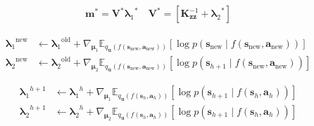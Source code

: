 \documentclass{article}
\newcommand{\state}{\ensuremath{\mathbf{s}}}
\newcommand{\action}{\ensuremath{\mathbf{a}}}
\newcommand{\inducingVariable}{\ensuremath{\mathbf{u}}}
\newcommand{\dualParam}[1]{\ensuremath{\bm{\lambda}_{#1}}}
\newcommand{\meanParam}[1]{\ensuremath{\bm{\mu}_{#1}}}
\newcommand{\horizon}{\ensuremath{h}}
\newcommand{\latentFn}{\ensuremath{f}}
\begin{document}
\begin{align} \label{eq-dual-params}
  \mathbf{m}^{*} = \mathbf{V}^{*}\dualParam{1}^{*} \quad \mathbf{V}^{*} = [\mathbf{K}_{\mathbf{z}\mathbf{z}}^{-1} + \dualParam{2}^{*}]
\end{align}

\begin{align} \label{eq-dual-update-svgp-old-new}
 \dualParam{1}^{\text{new}} &\leftarrow \dualParam{1}^{\text{old}} +
  \nabla_{\meanParam{1}} \mathbb{E}_{q_{\inducingVariable}(\latentFn(\state_{\text{new}}, \action_{\text{new}}))}
 \left[ \log p(\state_{\text{new}} \mid \latentFn(\state_{\text{new}}, \action_{\text{new}}) ) \right] \\
 \dualParam{2}^{\text{new}} &\leftarrow \dualParam{2}^{\text{old}} +
  \nabla_{\meanParam{2}} \mathbb{E}_{q_{\inducingVariable}(\latentFn(\state_{\text{new}}, \action_{\text{new}}))}
 \left[ \log p(\state_{\horizon+1} \mid \latentFn(\state_{\text{new}}, \action_{\text{new}}) ) \right]
\end{align}

\begin{align} \label{eq-dual-update-svgp}
 \dualParam{1}^{\horizon+1} &\leftarrow \dualParam{1}^{\horizon} +
  \nabla_{\meanParam{1}} \mathbb{E}_{q_{\inducingVariable}(\latentFn(\state_{\horizon}, \action_{\horizon}))}
 \left[ \log p(\state_{\horizon+1} \mid \latentFn(\state_{\horizon}, \action_{\horizon}) ) \right] \\
 \dualParam{2}^{\horizon+1} &\leftarrow \dualParam{2}^{\horizon} +
  \nabla_{\meanParam{2}} \mathbb{E}_{q_{\inducingVariable}(\latentFn(\state_{\horizon}, \action_{\horizon}))}
 \left[ \log p(\state_{\horizon+1} \mid \latentFn(\state_{\horizon}, \action_{\horizon}) ) \right]
\end{align}
\end{document}
